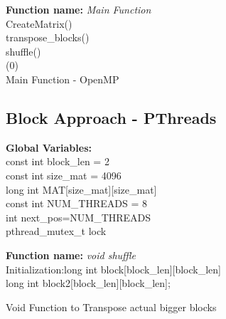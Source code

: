 \documentclass[10pt,journal]{article}
\begin{document}
\begin{algorithm}[H]
\SetAlgoLined
\textbf{Function name:} \emph{Main Function}\\\vspace{10pt}
CreateMatrix()\\
transpose\_blocks()\\
shuffle()\\
\Return(0)\\

\caption{Main Function - OpenMP}
\end{algorithm}



\subsection{Block Approach - PThreads}
\textbf{Global Variables:} \\
const int block\_len = 2\\
const int size\_mat = 4096\\
long int MAT[size\_mat][size\_mat]\\
const int NUM\_THREADS = 8\\
int next\_pos=NUM\_THREADS\\
pthread\_mutex\_t lock\\
\vspace{10pt}

\begin{algorithm}[H]
\SetAlgoLined
\textbf{Function name:} \emph{void shuffle}\\\vspace{10pt}
Initialization\::long int block[block\_len][block\_len]\\
      long int block2[block\_len][block\_len];\\
\vspace{10pt} 
\caption{Void Function to Transpose actual bigger blocks}
\end{algorithm}
\end{document}

